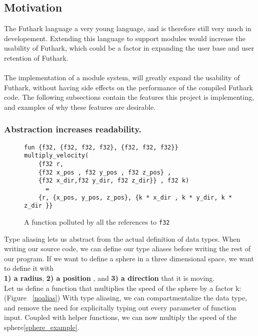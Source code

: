 \subsection{Motivation}
\label{subsec:label}
The Futhark language a very young language, and is therefore still very much in
developement.
Extending this language to support modules would increase the usability of
Futhark, which could be a factor in expanding the user base and user retention
of Futhark.
\\
\\
The implementation of a module system, will greatly expand the usability of
Futhark, without having side effects on the performance of the compiled Futhark code.
The following subsections contain the features this project is implementing, and
examples of why these features are desirable.
\subsubsection{Abstraction increases readability.} 
\begin{figure}
\begin{mdframed}
\begin{lstlisting}
fun {f32, {f32, f32, f32}, {f32, f32, f32}} multiply_velocity(
	{f32 r, 
	{f32 x_pos , f32 y_pos , f32 z_pos} , 
	{f32 x_dir,f32 y_dir, f32 z_dir}} , f32 k) 
	  =
    {r, {x_pos, y_pos, z_pos}, {k * x_dir , k * y_dir, k * z_dir }}
\end{lstlisting}
\caption{A function polluted by all the references to \texttt{f32} \label{noalias}}
\end{mdframed}
\label{noaliasing}
\end{figure}
Type aliasing lets us abstract from the actual definition of data types.
When writing our source code, we can define our type aliases before writing the
rest of our program.
If we want to define a sphere in a three dimensional space, we want to define it
with \\
\textbf{1) a radius}, \textbf{2) a position} , and \textbf{3) a direction} that it is
moving.\\
Let us define a function that multiplies the speed of the sphere by a factor k: (Figure ~\ref{noalias})
\clearpage
\noindent
With type aliasing, we can compartmentalize the data type, and remove the need
for explicitally typing out every parameter of function input.
Coupled with helper functions, we can now multiply the speed of the sphere\ref{sphere_example}.
